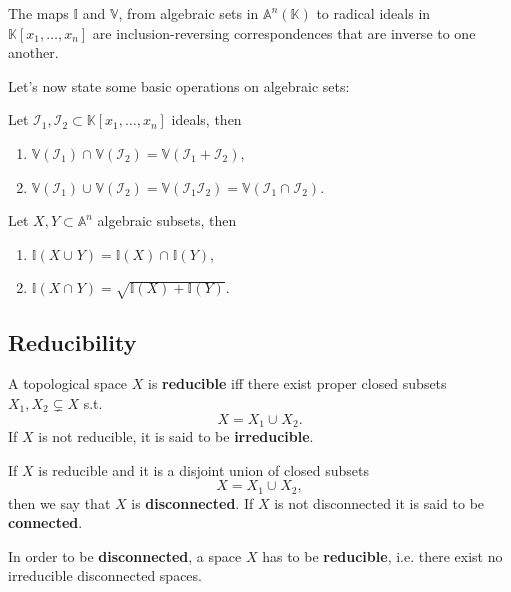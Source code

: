 \begin{cor}
	The maps $\mathbb{I}$ and $\mathbb{V}$, from algebraic sets in $\mathbb{A}^n(\mathbb{K})$ to radical ideals in  $\mathbb{K}\left[x_1, \ldots, x_n \right]$ are inclusion-reversing correspondences that are inverse to one another.
\end{cor} 

Let's now state some basic operations on algebraic sets:
\begin{lem}
	Let $\mathcal{I}_1, \mathcal{I}_2 \subset \mathbb{K}\left[x_1, \ldots, x_n \right]$ ideals, then
	\begin{enumerate}
		\item $\displaystyle{\mathbb{V}\left(\mathcal{I}_1\right) \cap_{} \mathbb{V}\left(\mathcal{I}_2\right) = \mathbb{V}\left(\mathcal{I}_1 + \mathcal{I}_2\right)}$,
		\item $\displaystyle{\mathbb{V}\left(\mathcal{I}_1\right) \cup_{} \mathbb{V}\left(\mathcal{I}_2\right) = \mathbb{V}\left(\mathcal{I}_1 \mathcal{I}_2\right) = \mathbb{V}\left(\mathcal{I}_1 \cap_{} \mathcal{I}_2\right)}$.
	\end{enumerate}
\end{lem} 

\begin{lem}
	Let $X, Y \subset \mathbb{A}^n$ algebraic subsets, then
	\begin{enumerate}
		\item $\displaystyle{\mathbb{I}\left( X \cup_{} Y \right) = \mathbb{I}\left( X \right) \cap_{} \mathbb{I}\left( Y \right)}$,
		\item $\displaystyle{\mathbb{I}\left( X \cap_{} Y \right) = \sqrt{\mathbb{I}\left( X \right) + \mathbb{I}\left( Y \right)}}$.
	\end{enumerate}
\end{lem} 

\subsection{Reducibility}
\begin{defn}
	A topological space $X$ is \textbf{reducible} iff there exist proper closed subsets $X_1, X_2 \subsetneq X$ s.t.
	\begin{equation}
	X = X_1 \cup_{} X_2
	.\end{equation} 
	If $X$ is not reducible, it is said to be \textbf{irreducible}.
\end{defn}
\begin{defn}
	If $X$ is reducible and it is a disjoint union of closed subsets
	\begin{equation}
	X = X_1 \cup_{} X_2
	,\end{equation} 
	then we say that $X$ is \textbf{disconnected}.
	If $X$ is not disconnected it is said to be \textbf{connected}.
\end{defn}
\begin{rem}
	In order to be \textbf{disconnected}, a space $X$ has to be \textbf{reducible}, i.e. there exist no irreducible disconnected spaces.
\end{rem}

